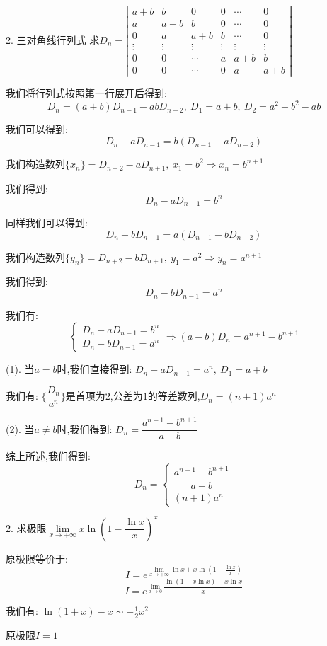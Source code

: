 2. 三对角线行列式
求$D_{n}=\left| 
\begin{matrix}
	a+b&b&0&0&\cdots&0\\
	a&a+b&b&0&\cdots&0\\
	0&a&a+b&b&\cdots&0\\
	\vdots&\vdots&\vdots&\vdots&\vdots&\vdots\\
	0&0&\cdots&a&a+b&b\\
	0&0&\cdots&0&a&a+b
\end{matrix}\right| $
\begin{solution}
	
	我们将行列式按照第一行展开后得到: 
	$$D_{n}=(a+b)D_{n-1}-abD_{n-2},\ D_{1}=a+b,\ D_{2}=a^2+b^2-ab$$
	
	我们可以得到: 
	$$D_{n}-aD_{n-1}=b(D_{n-1}-aD_{n-2})$$
	
	我们构造数列$\{x_{n}\}=D_{n+2}-aD_{n+1},\ x_{1}=b^2\Rightarrow x_{n}=b^{n+1}$
	
	我们得到: 
	$$D_{n}-aD_{n-1}=b^n$$
	
	同样我们可以得到: 
	$$D_{n}-bD_{n-1}=a(D_{n-1}-bD_{n-2})$$
	
	我们构造数列$\{y_{n}\}=D_{n+2}-bD_{n+1},\ y_{1}=a^2\Rightarrow y_{n}=a^{n+1}$
	
	我们得到: 
	$$D_{n}-bD_{n-1}=a^n$$
	
	我们有: $$\left\lbrace
	\begin{array}{l}
		D_{n}-aD_{n-1}=b^n\\
		D_{n}-bD_{n-1}=a^n
	\end{array}
	\right. \Rightarrow (a-b)D_{n}=a^{n+1}-b^{n+1}$$
	
	(1). 当$a=b$时,我们直接得到: $D_{n}-aD_{n-1}=a^n,\ D_{1}=a+b$
	
	我们有: $\{\dfrac{D_{n}}{a^n}\}$是首项为$2$,公差为$1$的等差数列,$D_{n}=(n+1)a^n$
	
	(2). 当$a\neq b$时,我们得到: $D_{n}=\dfrac{a^{n+1}-b^{n+1}}{a-b}$
	
	综上所述,我们得到: 
	$$D_{n}=\left\lbrace
	\begin{array}{l}
		\dfrac{a^{n+1}-b^{n+1}}{a-b}\\
		(n+1)a^n
	\end{array}
	\right. $$
\end{solution}

2. 求极限$\lim\limits_{x\rightarrow +\infty}x\ln(1-\dfrac{\ln x}{x})^{x}$
\begin{solution}
	
	原极限等价于: 
	$$I=e^{\lim\limits_{x\rightarrow+\infty}\ln x+x\ln(1-\frac{\ln x}{x})}$$
	$$I=e^{\lim\limits_{x\rightarrow 0 }\dfrac{\ln(1+x\ln x)-x\ln x}{x}}$$
	
	我们有: $\ln(1+x)-x\sim -\frac{1}{2}x^2$
	
	原极限$I=1$
\end{solution}

